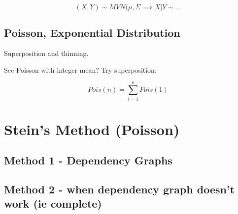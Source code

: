 \documentclass{article}
\begin{document}
\begin{fact}
	$$(X,Y) \sim MVN(\mu, \Sigma \implies X|Y \sim \ldots $$
\end{fact}

\subsection{Poisson, Exponential Distribution}
Superposition and thinning.

\begin{fact}[Superposition]
	See Poisson with integer mean? Try superposition:
	
	$$Pois(n) = \sum_{i=1}^n Pois(1)$$
\end{fact}

\begin{fact}
	
\end{fact}
\begin{fact}
	
\end{fact}


\section{Stein's Method (Poisson)}


\subsection{Method 1 - Dependency Graphs}

\subsection{Method 2 - when dependency graph doesn't work (ie complete)}
\end{document}
